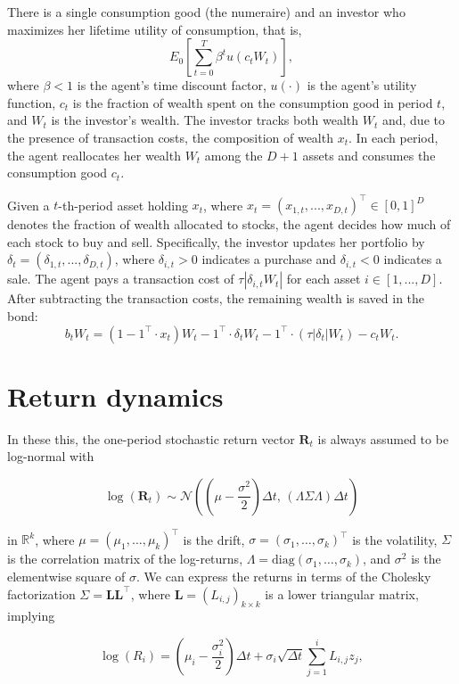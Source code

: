 \documentclass[10pt,a4paper]{article}
\numberwithin{equation}{section} %
\begin{document}
There is a single consumption good (the numeraire) and an investor who maximizes her lifetime utility of consumption, that is,
\[
E_0 \left[ \sum_{t=0}^{T} \beta^t u(c_t W_t) \right],
\]
where $\beta < 1$ is the agent’s time discount factor, $u(\cdot)$ is the agent’s utility function, $c_t$ is the fraction of wealth spent on the consumption good in period $t$, and $W_t$ is the investor’s wealth. The investor tracks both wealth $W_t$ and, due to the presence of transaction costs, the composition of wealth $x_t$. In each period, the agent reallocates her wealth $W_t$ among the $D+1$ assets and consumes the consumption good $c_t$.

Given a $t$-th-period asset holding $x_t$, where $x_t = (x_{1,t}, ..., x_{D,t})^\top \in [0, 1]^D$ denotes the fraction of wealth allocated to stocks, the agent decides how much of each stock to buy and sell. Specifically, the investor updates her portfolio by $\delta_t = (\delta_{1,t}, ..., \delta_{D,t})$, where $\delta_{i,t} > 0$ indicates a purchase and $\delta_{i,t} < 0$ indicates a sale. The agent pays a transaction cost of $\tau |\delta_{i,t} W_t|$ for each asset $i \in [1, ..., D]$. After subtracting the transaction costs, the remaining wealth is saved in the bond:
\[
b_t W_t = \left( 1 - 1^\top \cdot x_t \right) W_t - 1^\top \cdot \delta_t W_t - 1^\top \cdot (\tau |\delta_t| W_t) - c_t W_t.
\]
\section{Return dynamics}

In these this, the one-period stochastic return vector \(\mathbf{R}_t\) is always assumed to be log-normal with

\[
\log(\mathbf{R}_t) \sim \mathcal{N}\left( \left( \mu - \frac{\sigma^2}{2} \right)\Delta t, \, (\Lambda \Sigma \Lambda) \Delta t \right)
\]

in \(\mathbb{R}^k\), where \(\mu = (\mu_1, \dots, \mu_k)^\top\) is the drift, \(\sigma = (\sigma_1, \dots, \sigma_k)^\top\) is the volatility, \(\Sigma\) is the correlation matrix of the log-returns, \(\Lambda = \mathrm{diag}(\sigma_1, \dots, \sigma_k)\), and \(\sigma^2\) is the elementwise square of \(\sigma\). We can express the returns in terms of the Cholesky factorization \(\Sigma = \mathbf{L} \mathbf{L}^\top\), where \(\mathbf{L} = (L_{i,j})_{k \times k}\) is a lower triangular matrix, implying

\[
\log(R_i) = \left( \mu_i - \frac{\sigma_i^2}{2} \right) \Delta t + \sigma_i \sqrt{\Delta t} \sum_{j=1}^i L_{i,j} z_j,
\]
\end{document}
